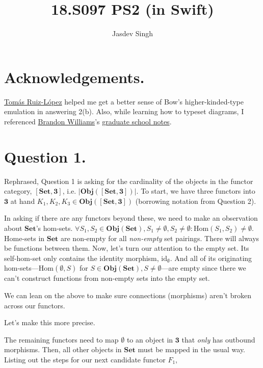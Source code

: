 \documentclass{article}
\title{18.S097 PS2 (in Swift)}
\author{Jasdev Singh}
\begin{document}
\maketitle

\section*{Acknowledgements.}

\href{https://twitter.com/tomasruizlopez}{Tomás Ruiz-López} helped me get a better sense of Bow’s higher-kinded-type emulation in answering 2(b). Also, while learning how to typeset diagrams, I referenced \href{https://twitter.com/mbrandonw}{Brandon Williams}’s \href{https://github.com/mbrandonw/my-math-notes}{graduate school notes}.

\section*{Question 1.}

Rephrased, Question 1 is asking for the cardinality of the objects in the functor category, $[\textbf{Set}, \textbf{3}]$, i.e. $|\textbf{Obj}([\textbf{Set}, \textbf{3}])|$. To start, we have three functors into $\textbf{3}$ at hand $K_1, K_2, K_3 \in \textbf{Obj}([\textbf{Set}, \textbf{3}])$ (borrowing notation from Question 2).

In asking if there are any functors beyond these, we need to make an observation about $\textbf{Set}$’s hom-sets. $\forall S_1, S_2 \in \textbf{Obj}(\textbf{Set}), S_1 \neq \emptyset, S_2 \neq \emptyset: \textrm{Hom}(S_1, S_2) \neq \emptyset$. Home-sets in $\textbf{Set}$ are non-empty for all \textit{non-empty} set pairings. There will always be functions between them.
Now, let's turn our attention to the empty set. Its self-hom-set only contains the identity morphism, $\textrm{id}_{\emptyset}$. And all of its originating hom-sets—$\textrm{Hom}(\emptyset, S)$ for $S \in \textbf{Obj}(\textbf{Set}), S \neq \emptyset$—are empty since there we can’t construct functions from non-empty sets into the empty set.

We can lean on the above to make sure connections (morphisms) aren’t broken across our functors.

Let’s make this more precise.

The remaining functors need to map $\emptyset$ to an object in $\textbf{3}$ that \textit{only} has outbound morphisms. Then, all other objects in $\textbf{Set}$ must be mapped in the usual way. Listing out the steps for our next candidate functor $F_1$,
\end{document}

